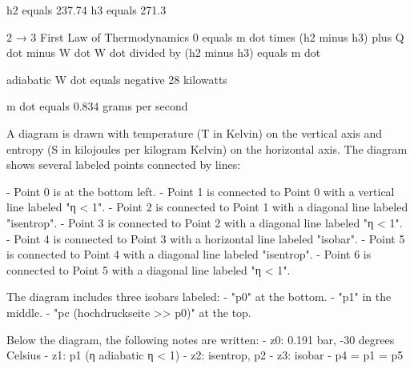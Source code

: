 h2 equals 237.74  
h3 equals 271.3  

2 → 3 First Law of Thermodynamics  
0 equals m dot times (h2 minus h3) plus Q dot minus W dot  
W dot divided by (h2 minus h3) equals m dot  

adiabatic  
W dot equals negative 28 kilowatts  

m dot equals 0.834 grams per second

A diagram is drawn with temperature (T in Kelvin) on the vertical axis and entropy (S in kilojoules per kilogram Kelvin) on the horizontal axis. The diagram shows several labeled points connected by lines:  

- Point 0 is at the bottom left.  
- Point 1 is connected to Point 0 with a vertical line labeled "η < 1".  
- Point 2 is connected to Point 1 with a diagonal line labeled "isentrop".  
- Point 3 is connected to Point 2 with a diagonal line labeled "η < 1".  
- Point 4 is connected to Point 3 with a horizontal line labeled "isobar".  
- Point 5 is connected to Point 4 with a diagonal line labeled "isentrop".  
- Point 6 is connected to Point 5 with a diagonal line labeled "η < 1".  

The diagram includes three isobars labeled:  
- "p0" at the bottom.  
- "p1" in the middle.  
- "pc (hochdruckseite >> p0)" at the top.  

Below the diagram, the following notes are written:  
- z0: 0.191 bar, -30 degrees Celsius  
- z1: p1 (η adiabatic η < 1)  
- z2: isentrop, p2  
- z3: isobar  
- p4 = p1 = p5